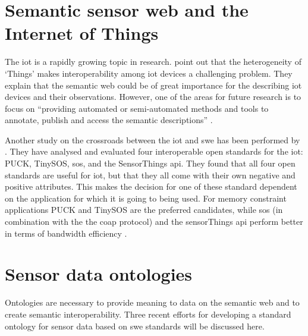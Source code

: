 \section{Semantic sensor web and the Internet of Things}
The \acf{iot} is a rapidly growing topic in research. \cite{IOT:Barnaghi} point out that the heterogeneity of `Things' makes interoperability among \ac{iot} devices a challenging problem. They explain that the semantic web could be of great importance for the describing \ac{iot} devices and their observations. However, one of the areas for future research is to focus on \enquote{providing automated or semi-automated methods and tools to annotate, publish and access the semantic descriptions} \cite[p. 19]{IOT:Barnaghi}.

Another study on the crossroads between the \ac{iot} and \ac{swe} has been performed by \cite{IOT:Jazayeri}. They have analysed and evaluated four interoperable open standards for the \ac{iot}: PUCK, TinySOS, \ac{sos}, and the SensorThings \ac{api}. They found that all four open standards are useful for \ac{iot}, but that they all come with their own negative and positive attributes. This makes the decision for one of these standard dependent on the application for which it is going to being used. For memory constraint applications PUCK and TinySOS are the preferred candidates, while \ac{sos} (in combination with the the coap protocol) and the sensorThings \ac{api} perform better in terms of bandwidth efficiency \citep{IOT:Jazayeri}.

\section{Sensor data ontologies}
\label{par:ontologies}

Ontologies are necessary to provide meaning to data on the semantic web and to create semantic interoperability. Three recent efforts for developing a standard ontology for sensor data based on \ac{swe} standards will be discussed here.

